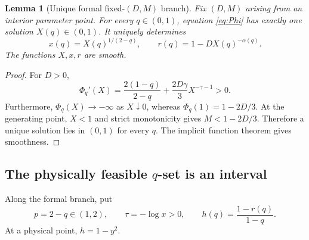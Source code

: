 \documentclass[11pt]{article}
\newtheorem{lemma}[theorem]{Lemma}
\begin{document}
\begin{lemma}[Unique formal fixed-$(D,M)$ branch]\label{lem:formal}
Fix $(D,M)$ arising from an interior parameter point.  For every $q\in(0,1)$, equation \eqref{eq:Phi} has exactly one solution $X(q)\in(0,1)$.  It uniquely determines
\[
x(q)=X(q)^{1/(2-q)},
\qquad
r(q)=1-DX(q)^{-\alpha(q)}.
\]
The functions $X,x,r$ are smooth.
\end{lemma}
\begin{proof}
For $D>0$,
\[
\Phi_q'(X)=\frac{2(1-q)}{2-q}
+\frac{2D\gamma}{3}X^{-\gamma-1}>0.
\]
Furthermore, $\Phi_q(X)\to-\infty$ as $X\downarrow0$, whereas
$\Phi_q(1)=1-2D/3$.  At the generating point, $X<1$ and strict monotonicity gives $M<1-2D/3$.  Therefore a unique solution lies in $(0,1)$ for every $q$.  The implicit function theorem gives smoothness.
\end{proof}

\subsection{The physically feasible \texorpdfstring{$q$}{q}-set is an interval}
Along the formal branch, put
\[
p=2-q\in(1,2),\qquad \tau=-\log x>0,
\qquad h(q)=\frac{1-r(q)}{1-q}.
\]
At a physical point, $h=1-y^2$.
\end{document}

